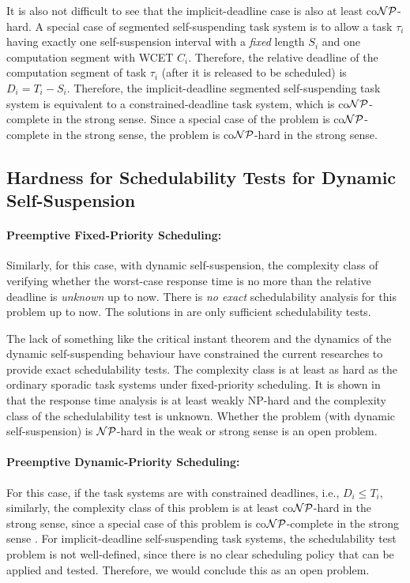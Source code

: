 It is also not difficult to see that the implicit-deadline case is also at least co${\cal NP}$-hard.  A special case of segmented self-suspending task system is to allow a task $\tau_i$ having exactly one self-suspension interval with a \emph{fixed} length $S_i$ and one computation segment with WCET $C_i$. Therefore, the relative deadline of the computation segment of task $\tau_i$ (after it is released to be scheduled) is $D_i = T_i-S_i$. Therefore, the implicit-deadline segmented self-suspending task system is equivalent to a constrained-deadline task system, which is co${\cal NP}$-complete in the strong sense. Since a special case of the problem is co${\cal NP}$-complete in the strong sense, the problem is co${\cal NP}$-hard in the strong sense.


\subsection{Hardness for Schedulability Tests for Dynamic Self-Suspension}
\paragraph{Preemptive Fixed-Priority Scheduling:}   

Similarly, for this case, with dynamic self-suspension, the complexity class of verifying whether the worst-case response time is no more than the relative deadline is \emph{unknown} up to now. There is \emph{no exact} schedulability analysis for this problem up to now. The solutions in \cite{Liu:2000:RS:518501}\cite{LiuChen:rtss2014}\cite{huangpass:dac2015} are only sufficient schedulability tests. 

The lack of something like the critical instant theorem and the dynamics of the dynamic self-suspending behaviour have constrained the current researches to provide exact schedulability tests. The complexity class is at least as hard as the ordinary sporadic task systems under fixed-priority scheduling. It is shown in \cite{EisenbrandR08} that the response time analysis is at least weakly NP-hard and the complexity class of the schedulability test is unknown. Whether the problem (with dynamic self-suspension) is ${\cal NP}$-hard in the weak or strong sense is an open problem.

\paragraph{Preemptive Dynamic-Priority Scheduling:} 
For this case, if the task systems are with constrained deadlines, i.e., $D_i \leq T_i$, similarly, the complexity class of this problem is at least co${\cal NP}$-hard in the strong sense, since a special case of this problem is co${\cal NP}$-complete in the strong sense \cite{DBLP:conf/ecrts/Ekberg015}. For implicit-deadline self-suspending task systems, the schedulability test problem is not well-defined, since there is no clear scheduling policy that can be applied and tested. Therefore, we would conclude this as an open problem.





  